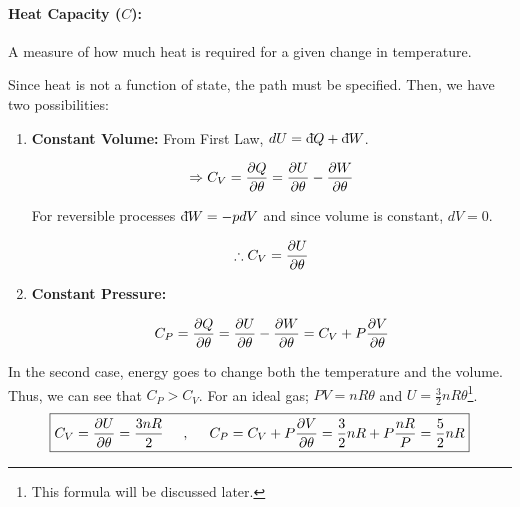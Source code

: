         \paragraph{Heat Capacity ($C$):} A measure of how much heat is required for a given change in temperature.
        
        Since heat is not a function of state, the path must be specified. Then, we have two possibilities:
        \begin{enumerate}
            \item \textbf{Constant Volume:} From First Law, $dU = \text{d}\hspace*{-0.13em}\bar{}\hspace*{0.1em} Q + \text{d}\hspace*{-0.13em}\bar{}\hspace*{0.1em} W$.
            
            \begin{equation}
                \Rightarrow C_V = \frac{\partial Q}{\partial \theta} = \frac{\partial U}{\partial \theta}-\frac{\partial W}{\partial \theta}
            \end{equation}
            
            For reversible processes $\text{d}\hspace*{-0.13em}\bar{}\hspace*{0.1em} W = -pdV$ and since volume is constant, $dV=0$.
            
            \begin{equation}
                \therefore C_V = \frac{\partial U}{\partial \theta}
            \end{equation}
            
            \item \textbf{Constant Pressure:} 
            
            \begin{equation}
                C_P = \frac{\partial Q}{\partial \theta} = \frac{\partial U}{\partial \theta}-\frac{\partial W}{\partial \theta} = C_V+P\frac{\partial V}{\partial \theta}
            \end{equation}
        \end{enumerate}
        In the second case, energy goes to change both the temperature and the volume. Thus, we can see that $C_P > C_V$. For an ideal gas; $PV = nR\theta$ and $\boxed{U=\frac{3}{2}nR\theta}$\footnote{This formula will be discussed later.}. 
        \begin{equation}
            \boxed{C_V = \frac{\partial U}{\partial \theta} = \frac{3nR}{2} \hspace{0.5cm},\hspace{0.5cm} C_P = C_V + P\frac{\partial V}{\partial \theta}=\frac{3}{2}nR + P\frac{nR}{P} = \frac{5}{2}nR}
        \end{equation}
        
